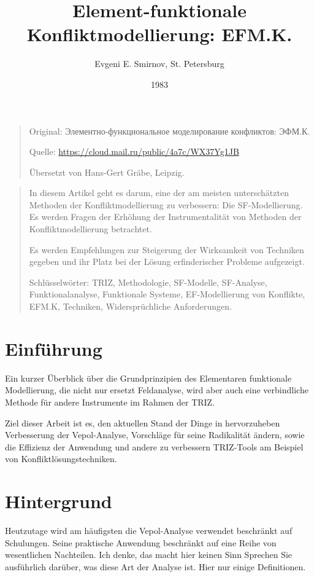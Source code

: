 \documentclass[11pt,a4paper]{article}
\title{Element-funktionale Konfliktmodellierung: EFM.K.}
\author{Evgeni E. Smirnov, St. Petersburg}
\date{1983}
\begin{document}
\maketitle
\begin{quote}
  Original: \foreignlanguage{russian}{Элементно-функциональное моделирование
    конфликтов: ЭФМ.К}.

  Quelle: \url{https://cloud.mail.ru/public/4a7c/WX37Yg1JB}
  
  Übersetzt von Hans-Gert Gräbe, Leipzig.
\end{quote}
\begin{quote}
  In diesem Artikel geht es darum, eine der am meisten unterschätzten Methoden
  der Konfliktmodellierung zu verbessern: Die SF-Modellierung.  Es werden Fragen
  der Erhöhung der Instrumentalität von Methoden der Konfliktmodellierung
  betrachtet.

  Es werden Empfehlungen zur Steigerung der Wirksamkeit von Techniken gegeben
  und ihr Platz bei der Lösung erfinderischer Probleme aufgezeigt.

  Schlüsselwörter: TRIZ, Methodologie, SF-Modelle, SF-Analyse,
  Funktionalanalyse, Funktionale Systeme, EF-Modellierung von Konflikte,
  EFM.K, Techniken, Widersprüchliche Anforderungen.
\end{quote}

\section*{Einführung}

Ein kurzer Überblick über die Grundprinzipien des Elementaren funktionale
Modellierung, die nicht nur ersetzt Feldanalyse, wird aber auch eine
verbindliche Methode für andere Instrumente im Rahmen der TRIZ.

Ziel dieser Arbeit ist es, den aktuellen Stand der Dinge in hervorzuheben
Verbesserung der Vepol-Analyse, Vorschläge für seine Radikalität ändern, sowie
die Effizienz der Anwendung und andere zu verbessern TRIZ-Tools am Beispiel
von Konfliktlösungstechniken.

\section*{Hintergrund}

Heutzutage wird am häufigsten die Vepol-Analyse verwendet beschränkt auf
Schulungen. Seine praktische Anwendung beschränkt auf eine Reihe von
wesentlichen Nachteilen. Ich denke, das macht hier keinen Sinn Sprechen Sie
ausführlich darüber, was diese Art der Analyse ist. Hier nur einige
Definitionen.
\end{document}
